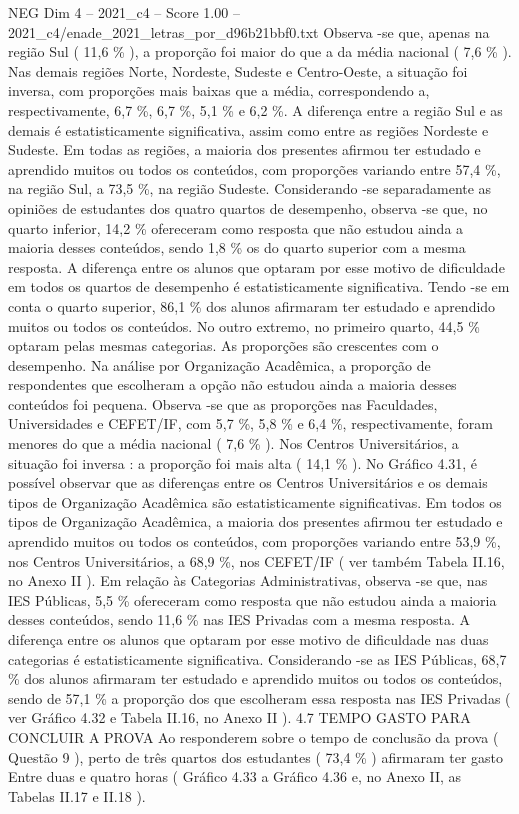 \begin{textsample}{NEG Dim 4 – 2021\_c4 – Score 1.00 – 2021\_c4/enade\_2021\_letras\_por\_d96b21bbf0.txt}
Observa -se que, apenas na região Sul ( 11,6 \% ), a proporção foi maior do que a da média nacional ( 7,6 \% ).
Nas demais regiões Norte, Nordeste, Sudeste e Centro-Oeste, a situação foi inversa, com proporções mais baixas que a média, correspondendo a, respectivamente, 6,7 \%, 6,7 \%, 5,1 \% e 6,2 \%.
A diferença entre a região Sul e as demais é estatisticamente significativa, assim como entre as regiões Nordeste e Sudeste.
Em todas as regiões, a maioria dos presentes afirmou ter estudado e aprendido muitos ou todos os conteúdos, com proporções variando entre 57,4 \%, na região Sul, a 73,5 \%, na região Sudeste.
Considerando -se separadamente as opiniões de estudantes dos quatro quartos de desempenho, observa -se que, no quarto inferior, 14,2 \% ofereceram como resposta que não estudou ainda a maioria desses conteúdos, sendo 1,8 \% os do quarto superior com a mesma resposta.
A diferença entre os alunos que optaram por esse motivo de dificuldade em todos os quartos de desempenho é estatisticamente significativa.
Tendo -se em conta o quarto superior, 86,1 \% dos alunos afirmaram ter estudado e aprendido muitos ou todos os conteúdos.
No outro extremo, no primeiro quarto, 44,5 \% optaram pelas mesmas categorias.
As proporções são crescentes com o desempenho.
Na análise por Organização Acadêmica, a proporção de respondentes que escolheram a opção não estudou ainda a maioria desses conteúdos foi pequena.
Observa -se que as proporções nas Faculdades, Universidades e CEFET/IF, com 5,7 \%, 5,8 \% e 6,4 \%, respectivamente, foram menores do que a média nacional ( 7,6 \% ).
Nos Centros Universitários, a situação foi inversa : a proporção foi mais alta ( 14,1 \% ).
No Gráfico 4.31, é possível observar que as diferenças entre os Centros Universitários e os demais tipos de Organização Acadêmica são estatisticamente significativas.
Em todos os tipos de Organização Acadêmica, a maioria dos presentes afirmou ter estudado e aprendido muitos ou todos os conteúdos, com proporções variando entre 53,9 \%, nos Centros Universitários, a 68,9 \%, nos CEFET/IF ( ver também Tabela II.16, no Anexo II ).
Em relação às Categorias Administrativas, observa -se que, nas IES Públicas, 5,5 \% ofereceram como resposta que não estudou ainda a maioria desses conteúdos, sendo 11,6 \% nas IES Privadas com a mesma resposta.
A diferença entre os alunos que optaram por esse motivo de dificuldade nas duas categorias é estatisticamente significativa.
Considerando -se as IES Públicas, 68,7 \% dos alunos afirmaram ter estudado e aprendido muitos ou todos os conteúdos, sendo de 57,1 \% a proporção dos que escolheram essa resposta nas IES Privadas ( ver Gráfico 4.32 e Tabela II.16, no Anexo II ). 4.7 TEMPO GASTO PARA CONCLUIR A PROVA Ao responderem sobre o tempo de conclusão da prova ( Questão 9 ), perto de três quartos dos estudantes ( 73,4 \% ) afirmaram ter gasto Entre duas e quatro horas ( Gráfico 4.33 a Gráfico 4.36 e, no Anexo II, as Tabelas II.17 e II.18 ).

\end{textsample}
